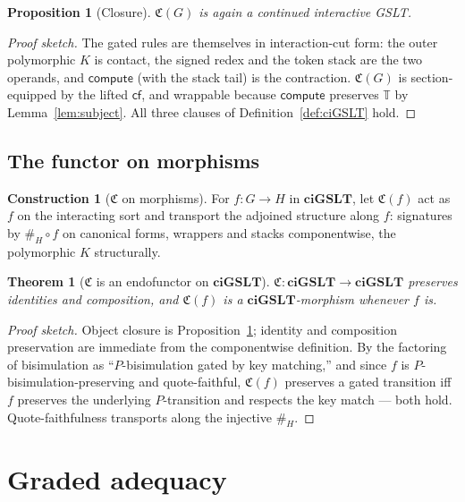 \documentclass[11pt]{article}
\theoremstyle{definition}
\newtheorem{construction}[definition]{Construction}
\theoremstyle{plain}
\newtheorem{theorem}[definition]{Theorem}
\newtheorem{proposition}[definition]{Proposition}
\newcommand{\ciGSLT}{\mathbf{ciGSLT}}
\newcommand{\WT}{\mathbb{T}}                  %
\newcommand{\Cost}{\mathfrak{C}}              %
\newcommand{\hashf}{\#}
\newcommand{\compute}{\mathsf{compute}}
\newcommand{\cf}{\mathsf{cf}}
\begin{document}
\begin{proposition}[Closure]
\label{prop:closure}
$\Cost(G)$ is again a continued interactive GSLT.
\end{proposition}

\begin{proof}[Proof sketch]
The gated rules are themselves in interaction-cut form: the outer
polymorphic $K$ is contact, the signed redex and the token stack are the
two operands, and $\compute$ (with the stack tail) is the contraction.
$\Cost(G)$ is section-equipped by the lifted $\cf$, and wrappable because
$\compute$ preserves $\WT$ by Lemma~\ref{lem:subject}. All three clauses
of Definition~\ref{def:ciGSLT} hold.
\end{proof}

\subsection{The functor on morphisms}

\begin{construction}[$\Cost$ on morphisms]
For $f : G \to H$ in $\ciGSLT$, let $\Cost(f)$ act as $f$ on the
interacting sort and transport the adjoined structure along $f$:
signatures by $\hashf_H\circ f$ on canonical forms, wrappers and stacks
componentwise, the polymorphic $K$ structurally.
\end{construction}

\begin{theorem}[$\Cost$ is an endofunctor on $\ciGSLT$]
\label{thm:functor}
$\Cost : \ciGSLT \to \ciGSLT$ preserves identities and composition, and
$\Cost(f)$ is a $\ciGSLT$-morphism whenever $f$ is.
\end{theorem}

\begin{proof}[Proof sketch]
Object closure is Proposition~\ref{prop:closure}; identity and
composition preservation are immediate from the componentwise definition.
By the factoring of bisimulation as ``$P$-bisimulation gated by key
matching,'' and since $f$ is $P$-bisimulation-preserving and
quote-faithful, $\Cost(f)$ preserves a gated transition iff $f$ preserves
the underlying $P$-transition and respects the key match --- both hold.
Quote-faithfulness transports along the injective $\hashf_H$.
\end{proof}

\section{Graded adequacy}
\label{sec:adequacy}
\end{document}

